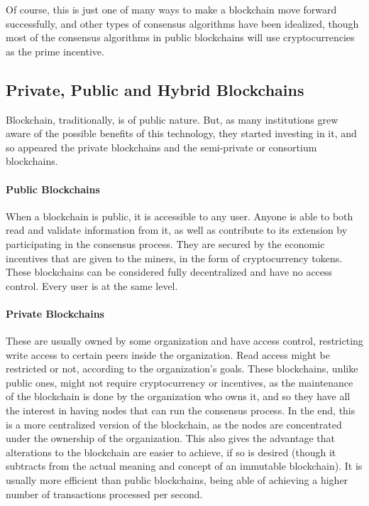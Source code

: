      Of course, this is just one of many ways to make a blockchain move forward successfully, and other types of consensus algorithms have been idealized, though most of the consensus algorithms in public blockchains will use cryptocurrencies as the prime incentive.
    
    
\subsection{Private, Public and Hybrid Blockchains}

    Blockchain, traditionally, is of public nature. But, as many institutions grew aware of the possible benefits of this technology, they started investing in it, and so appeared the private blockchains and the semi-private or consortium blockchains.
    
    \paragraph{Public Blockchains} When a blockchain is public, it is accessible to any user. Anyone is able to both read and validate information from it, as well as contribute to its extension by participating in the consensus process. They are secured by the economic incentives that are given to the miners, in the form of cryptocurrency tokens. These blockchains can be  considered fully decentralized and have no access control. Every user is at the same level.
    
    \paragraph{Private Blockchains} These are usually owned by some organization and have access control, restricting write access to certain peers inside the organization. Read access might be restricted or not, according to the organization's goals. These blockchains, unlike public ones, might not require cryptocurrency or incentives, as the maintenance of the blockchain is done by the organization who owns it, and so they have all the interest in having nodes that can run the consensus process. In the end, this is a more centralized version of the blockchain, as the nodes are concentrated under the ownership of the organization. This also gives the advantage that alterations to the blockchain are easier to achieve, if so is desired (though it subtracts from the actual meaning and concept of an immutable blockchain). It is usually more efficient than public blockchains, being able of achieving a higher number of transactions processed per second.
    
